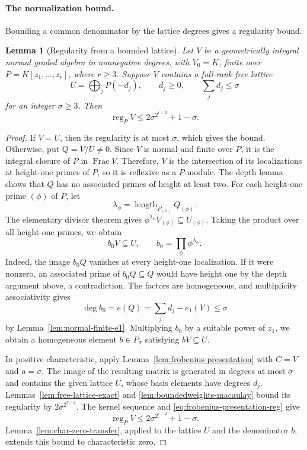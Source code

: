 \documentclass[12pt]{amsart}
\numberwithin{equation}{section}
\newtheorem{lemma}[theorem]{Lemma}
\theoremstyle{definition}
\theoremstyle{remark}
\numberwithin{equation}{section}
\DeclareMathOperator{\reg}{reg}
\DeclareMathOperator{\Frac}{Frac}
\begin{document}
\paragraph{\textbf{The normalization bound.}}
Bounding a common denominator by the lattice degrees gives a regularity bound.
\begin{lemma}[Regularity from a bounded lattice]
\label{lem:normal-fiber-lattice-regularity}
Let $V$ be a geometrically integral normal graded algebra in
nonnegative degrees, with $V_0=K$, finite over
$P=K[z_1,\ldots,z_r]$, where $r\ge3$.
Suppose $V$ contains a full-rank free lattice
\[
 U=\bigoplus_jP(-d_j),\qquad d_j\ge0,
 \qquad\sum_jd_j\le\sigma
\]
for an integer $\sigma\ge3$.
Then
\[
 \reg_PV\le2\sigma^{2^{r-2}}+1-\sigma.
\]
\end{lemma}
\begin{proof}
If $V=U$, then its regularity is at most $\sigma$, which gives the bound. Otherwise, put $Q=V/U\ne0$. Since $V$ is normal and finite over $P$, it is
the integral closure of $P$ in $\Frac V$. Therefore, $V$ is the intersection of its localizations at height-one primes of $P$, so it is reflexive as a $P$-module.
The depth lemma shows that $Q$ has no associated primes of height at least two. For each height-one prime $(\phi)$ of $P$, let
\[
 \lambda_\phi=\operatorname{length}_{P_{(\phi)}}Q_{(\phi)}.
\]
The elementary divisor theorem gives $\phi^{\lambda_\phi}V_{(\phi)}\subseteq U_{(\phi)}$. Taking the product over all height-one primes, we obtain
\[
 b_0V\subseteq U,\qquad
 b_0=\prod_\phi\phi^{\lambda_\phi}.
\]
 Indeed, the image $b_0Q$ vanishes at every height-one localization. If it were nonzero, an associated prime of $b_0Q\subseteq Q$ would have height one by the depth argument above, a contradiction. The factors are homogeneous, and multiplicity associativity gives
\[
 \deg b_0=e(Q)=\sum_jd_j-e_1(V)\le\sigma
\]
by Lemma~\ref{lem:normal-finite-e1}. Multiplying $b_0$ by a suitable power of $z_1$, we obtain a homogeneous element $b\in P_\sigma$ satisfying
$bV\subseteq U$.

In positive characteristic, apply Lemma~\ref{lem:frobenius-presentation} with $C=V$ and $a=\sigma$. The image of the resulting matrix is generated in degrees at most $\sigma$ and contains the given lattice $U$, whose basis elements have degrees $d_j$. Lemmas~\ref{lem:free-lattice-exact} and
\ref{lem:boundedweights-macaulay} bound its regularity by $2\sigma^{2^{r-2}}$.
The kernel sequence and \eqref{eq:frobenius-presentation-reg} give
\[
 \reg_PV\le2\sigma^{2^{r-2}}+1-\sigma.
\]
Lemma~\ref{lem:char-zero-transfer}, applied to the lattice $U$ and the denominator $b$, extends this bound to characteristic zero.
\end{proof}
\end{document}
